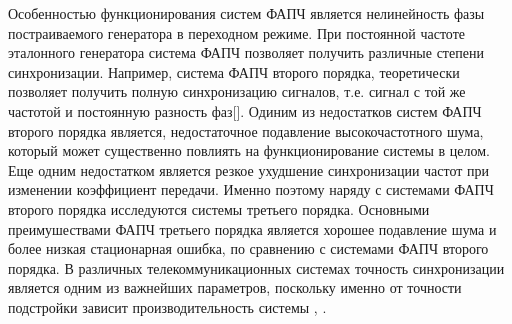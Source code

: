\documentclass[a4paper,14pt]{extarticle} %
\begin{document}

Особенностью функционирования систем ФАПЧ является нелинейность фазы постраиваемого генератора в переходном режиме. При постоянной частоте эталонного генератора система ФАПЧ позволяет получить различные степени синхронизации. Например, система ФАПЧ второго порядка, теоретически позволяет получить полную синхронизацию сигналов, т.е. сигнал с той же частотой и постоянную разность фаз[]. Одиним из недостатков систем ФАПЧ второго порядка является, недостаточное подавление высокочастотного шума, который может существенно повлиять на функционирование системы в целом. Еще одним недостатком является резкое ухудшение синхронизации частот при изменении коэффициент передачи. Именно поэтому наряду с системами ФАПЧ второго порядка исследуются системы третьего порядка. Основными преимушествами ФАПЧ третьего порядка является хорошее подавление шума и более низкая стационарная ошибка, по сравнению с системами ФАПЧ второго порядка\cite{thirdOrderPLL}. В различных телекоммуникационных системах точность синхронизации является одним из важнейших параметров, поскольку именно от точности подстройки зависит производительность системы \cite{UsageOfThirdOrder1}, \cite{UsageOfThirdOrder2}.
\end{document}
